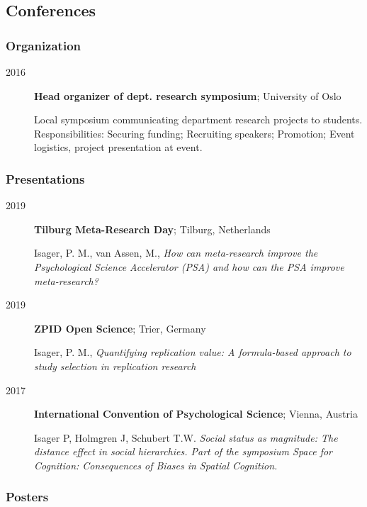 \documentclass[]{article}
\begin{document}
\hypertarget{conferences}{%
\subsection{Conferences}\label{conferences}}

\hypertarget{organization}{%
\subsubsection{Organization}\label{organization}}

\begin{description}
\item[2016]
\textbf{Head organizer of dept. research symposium}; University of Oslo

Local symposium communicating department research projects to students.
Responsibilities: Securing funding; Recruiting speakers; Promotion;
Event logistics, project presentation at event.
\end{description}

\hypertarget{presentations}{%
\subsubsection{Presentations}\label{presentations}}

\begin{description}
\item[2019]
\textbf{Tilburg Meta-Research Day}; Tilburg, Netherlands

Isager, P. M., van Assen, M., \emph{How can meta-research improve the
Psychological Science Accelerator (PSA) and how can the PSA improve
meta-research?}
\item[2019]
\textbf{ZPID Open Science}; Trier, Germany

Isager, P. M., \emph{Quantifying replication value: A formula-based
approach to study selection in replication research}
\item[2017]
\textbf{International Convention of Psychological Science}; Vienna,
Austria

Isager P, Holmgren J, Schubert T.W. \emph{Social status as magnitude:
The distance effect in social hierarchies. Part of the symposium Space
for Cognition: Consequences of Biases in Spatial Cognition.}
\end{description}

\hypertarget{posters}{%
\subsubsection{Posters}\label{posters}}
\end{document}
